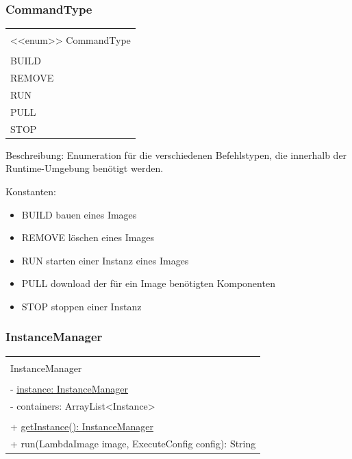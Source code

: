\documentclass[a4paper,20pt,oneside]{book}
\begin{document}
	\subsubsection{CommandType}
	\centering
	\begin{tabular}{|l|}
	\hline \\
	<<enum>> CommandType \\
	\hline \\
	BUILD\\
    REMOVE\\
    RUN\\
    PULL\\
    STOP \\
	\hline 
	\end{tabular}
	
	\raggedright
	\vspace{0.5cm}
	
	Beschreibung: Enumeration für die verschiedenen Befehlstypen, die innerhalb der Runtime-Umgebung benötigt werden.
	
	\vspace{0.5cm}
	Konstanten:
	\begin{itemize}
	\item BUILD
	\linebreak bauen eines Images
	\item REMOVE
	\linebreak löschen eines Images
	\item RUN
	\linebreak starten einer Instanz eines Images
	\item PULL
	\linebreak download der für ein Image benötigten Komponenten
	\item STOP
	\linebreak stoppen einer Instanz
	\end{itemize}

	
	\subsubsection{InstanceManager}
	\centering
	\begin{tabular}{|l|}
	\hline \\
	InstanceManager \\
	\hline \\
	- \uline{instance: InstanceManager} \\
	- containers: ArrayList<Instance> \\
	\hline \\
	+ \uline{getInstance(): InstanceManager} \\
	+ run(LambdaImage image, ExecuteConfig config): String\\
	\hline 
	\end{tabular}
	
\end{document}
